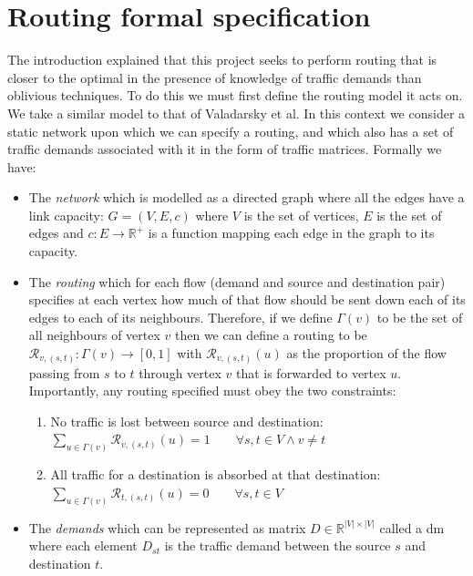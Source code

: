 \section{Routing formal specification}
\label{section:routing}
The introduction explained that this project seeks to perform routing that is closer to the optimal in the presence of knowledge of traffic demands than oblivious techniques. To do this we must first define the routing model it acts on. We take a similar model to that of Valadarsky et al. In this context we consider a static network upon which we can specify a routing, and which also has a set of traffic demands associated with it in the form of traffic matrices. Formally we have:
\begin{itemize}
  \item The \emph{network} which is modelled as a directed graph where all the edges have a link capacity: $G=(V,E,c)$ where $V$ is the set of vertices, $E$ is the set of edges and $c : E \rightarrow \mathbb{R}^+$ is a function mapping each edge in the graph to its capacity.
  \item The \emph{routing} which for each flow (demand and source and destination pair) specifies at each vertex how much of that flow should be sent down each of its edges to each of its neighbours. Therefore, if we define $\Gamma(v)$ to be the set of all neighbours of vertex $v$ then we can define a routing to be $\mathcal{R}_{v,(s,t)} : \Gamma(v) \rightarrow [0,1]$ with $\mathcal{R}_{v,(s,t)}(u)$ as the proportion of the flow passing from $s$ to $t$ through vertex $v$ that is forwarded to vertex $u$. Importantly, any routing specified must obey the two constraints:
    \begin{enumerate}
      \item No traffic is lost between source and destination:\\
        $\sum_{u \in \Gamma(v)}{\mathcal{R}_{v,(s,t)}(u)} = 1 \qquad \forall s, t \in V \wedge v \neq t$
      \item All traffic for a destination is absorbed at that destination:\\
        $\sum_{u \in \Gamma(v)}{\mathcal{R}_{t,(s,t)}(u)} = 0 \qquad \forall s, t \in V$
    \end{enumerate}
  \item The \emph{demands} which can be represented as matrix $D \in \mathbb{R}^{|V|\times|V|}$ called a \ac{dm} where each element $D_{st}$ is the traffic demand between the source $s$ and destination $t$.
\end{itemize}

